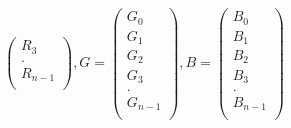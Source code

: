 \begin{compactitem}
\[\begin{pmatrix}
       R_3\\[0.3em]
		. \\[0.3em]
       R_{n-1}\\[0.3em]
\end{pmatrix}
, G=
\begin{pmatrix}
       G_0\\[0.3em]
       G_1\\[0.3em]
       G_2\\[0.3em]
       G_3\\[0.3em]
		. \\[0.3em]
       G_{n-1}\\[0.3em]
\end{pmatrix}
, B=
\begin{pmatrix}
       B_0\\[0.3em]
       B_1\\[0.3em]
       B_2\\[0.3em]
       B_3\\[0.3em]
		. \\[0.3em]
       B_{n-1}\\[0.3em]
\end{pmatrix}
\]


\end{compactitem}
